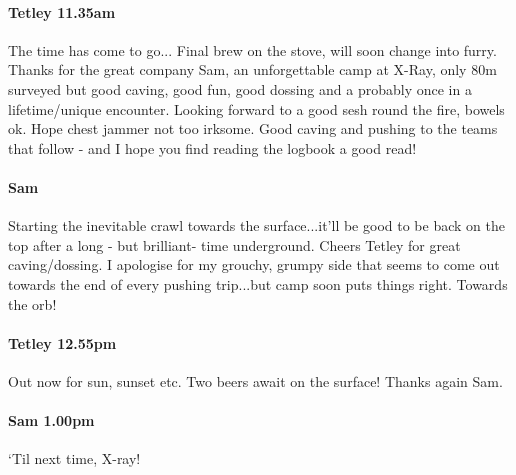 \paragraph{Tetley 11.35am}
The time has come to go...
Final brew on the stove, will soon change into furry. Thanks for the great company Sam, an unforgettable camp at X-Ray, only 80m surveyed but good caving, good fun, good dossing and a probably once in a lifetime/unique encounter.
Looking forward to a good sesh round the fire, bowels ok. Hope chest jammer not too irksome.
Good caving and pushing to the teams that follow - and I hope you find reading the logbook a good read!


\paragraph{Sam}
Starting the inevitable crawl towards the surface...it’ll be good to be back on the top after a long - but brilliant- time underground. Cheers Tetley for great caving/dossing. I apologise for my grouchy, grumpy side that seems to come out towards the end of every pushing trip...but camp soon puts things right. Towards the orb!


\paragraph{Tetley 12.55pm}
Out now for sun, sunset etc. Two beers await on the surface! Thanks again Sam.


\paragraph{Sam 1.00pm}
‘Til next time, X-ray!